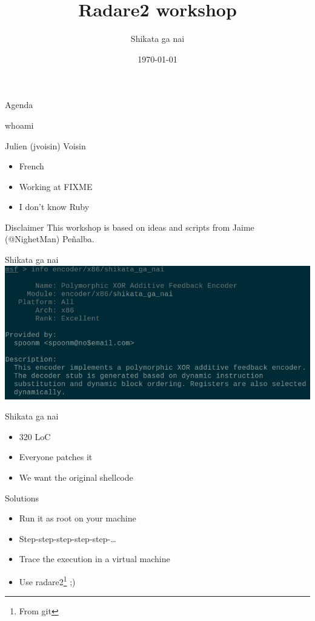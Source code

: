 \documentclass{beamer}
\title{Radare2 workshop}
\author{Shikata ga nai}
\date{\today}
\institute{hack.lu 2015}
\begin{document}
\maketitle

\begin{frame}{Agenda}
	\tableofcontents
\end{frame}

\begin{frame}{whoami}
	\begin{block}{Julien (jvoisin) Voisin}
	\begin{itemize}
		\item French
		\item Working at FIXME
		\item I don't know Ruby
	\end{itemize}
	\end{block}
\end{frame}

\begin{frame}{Disclaimer}
	This workshop is based on ideas and scripts from Jaime (@NighetMan) Peñalba.
\end{frame}

\begin{frame}{Shikata ga nai}
	\includegraphics[width=\textwidth]{description.png}
\end{frame}

\begin{frame}{Shikata ga nai}
	\begin{itemize}
		\item 320 LoC
		\item Everyone patches it
		\item We want the original shellcode
	\end{itemize}
\end{frame}

\begin{frame}{Solutions}
	\begin{itemize}
		\item Run it as root on your machine
		\item Step-step-step-step-step-…
		\item Trace the execution in a virtual machine
		\item Use radare2\footnote{From git} ;)
	\end{itemize}
\end{frame}
\end{document}
